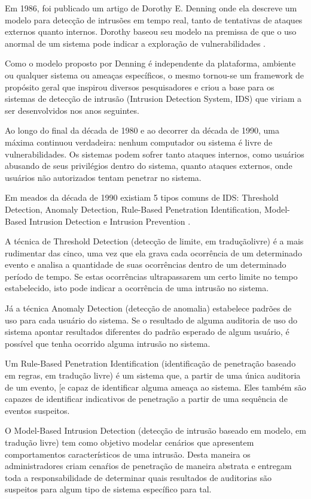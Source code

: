 \documentclass[openright]{normas-utf-tex} %
\begin{document}
	Em 1986, foi publicado um artigo de Dorothy E. Denning onde ela descreve um modelo para detecção de intrusões em tempo real, tanto de tentativas de ataques externos quanto internos. Dorothy baseou seu modelo na premissa de que o uso anormal de um sistema pode indicar a exploração de vulnerabilidades \cite{denning}.
	
	Como o modelo proposto por Denning é independente da plataforma, ambiente ou qualquer sistema ou ameaças específicos, o mesmo tornou-se um framework de propósito geral que inspirou diversos pesquisadores \cite{roleof} e criou a base para os sistemas de detecção de intrusão (Intrusion Detection System, IDS) que viriam a ser desenvolvidos nos anos seguintes. 
	
	Ao longo do final da década de 1980 e ao decorrer da década de 1990, uma máxima continuou verdadeira: nenhum computador ou sistema é livre de vulnerabilidades. Os sistemas podem sofrer tanto ataques internos, como usuários abusando de seus privilégios dentro do sistema, quanto ataques externos, onde usuários não autorizados tentam penetrar no sistema.
	
	Em meados da década de 1990 existiam 5 tipos comuns de IDS: Threshold Detection, Anomaly Detection, Rule-Based Penetration Identification, Model-Based Intrusion Detection e Intrusion Prevention \cite{statet}. 
	
	A técnica de Threshold Detection (detecção de limite, em traduçãolivre) é a mais rudimentar das cinco, uma vez que ela grava cada ocorrência de um determinado evento e analisa a quantidade de suas ocorrências dentro de um determinado período de tempo. Se estas ocorrências ultrapassarem um certo limite no tempo estabelecido, isto pode indicar a ocorrência de uma intrusão no sistema.
	
	Já a técnica Anomaly Detection (detecção de anomalia) estabelece padrões de uso para cada usuário do sistema. Se o resultado de alguma auditoria de uso do sistema apontar resultados diferentes do padrão esperado de algum usuário, é possível que tenha ocorrido alguma intrusão no sistema.
	
	Um Rule-Based Penetration Identification (identificação de penetração baseado em regras, em tradução livre) é um sistema que, a partir de uma única auditoria de um evento, [e capaz de identificar alguma ameaça ao sistema. Eles também são capazes de identificar indicativos de penetração a partir de uma sequência de eventos suspeitos.
	
	O Model-Based Intrusion Detection (detecção de intrusão baseado em modelo, em tradução livre) tem como objetivo modelar cenários que apresentem comportamentos característicos de uma intrusão. Desta maneira os administradores criam cenaŕios de penetração de maneira abstrata e entregam toda a responsabilidade de determinar quais resultados de auditorias são suspeitos para algum tipo de sistema específico para tal.
	
\end{document}
